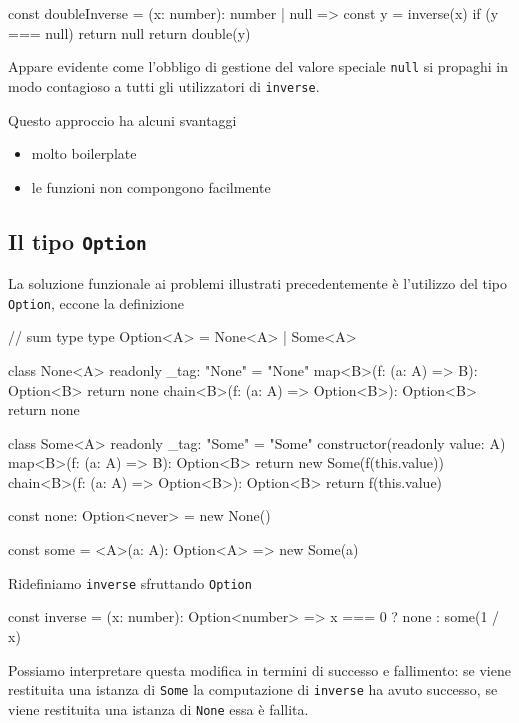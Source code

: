 \documentclass[12pt]{article}
\theoremstyle{definition}
\newenvironment{code}
  {\vspace{0.5cm} \VerbatimEnvironment\begin{typescriptcode}}
  {\end{typescriptcode} \vspace{0.2cm}}
\begin{document}
\begin{code}
const doubleInverse = (x: number): number | null => {
  const y = inverse(x)
  if (y === null) return null
  return double(y)
}
\end{code}

Appare evidente come l'obbligo di gestione del valore speciale \texttt{null} si propaghi in modo contagioso
a tutti gli utilizzatori di \texttt{inverse}.

Questo approccio ha alcuni svantaggi

\begin{itemize}
  \item molto boilerplate
  \item le funzioni non compongono facilmente
\end{itemize}

\subsection{Il tipo \texttt{Option}}

La soluzione funzionale ai problemi illustrati precedentemente è l'utilizzo del tipo \texttt{Option},
eccone la definizione

\begin{code}
// sum type
type Option<A> = None<A> | Some<A>

class None<A> {
  readonly _tag: "None" = "None"
  map<B>(f: (a: A) => B): Option<B> {
    return none
  }
  chain<B>(f: (a: A) => Option<B>): Option<B> {
    return none
  }
}

class Some<A> {
  readonly _tag: "Some" = "Some"
  constructor(readonly value: A) {}
  map<B>(f: (a: A) => B): Option<B> {
    return new Some(f(this.value))
  }
  chain<B>(f: (a: A) => Option<B>): Option<B> {
    return f(this.value)
  }
}

const none: Option<never> = new None()

const some = <A>(a: A): Option<A> => new Some(a)
\end{code}

Ridefiniamo \texttt{inverse} sfruttando \texttt{Option}

\begin{code}
const inverse = (x: number): Option<number> =>
  x === 0 ? none : some(1 / x)
\end{code}

Possiamo interpretare questa modifica in termini di successo e fallimento: se viene restituita una istanza di \texttt{Some}
la computazione di \texttt{inverse} ha avuto successo, se viene restituita una istanza di \texttt{None} essa è fallita.
\end{document}
